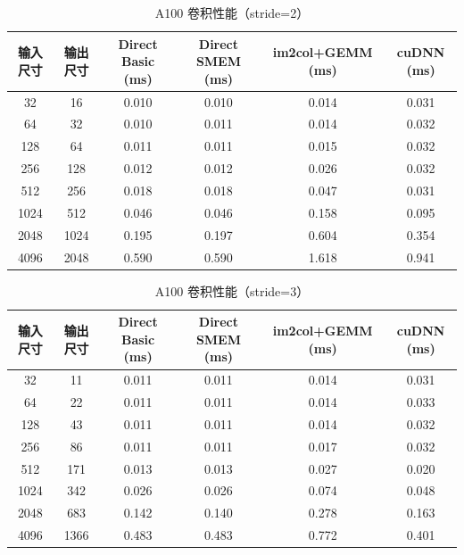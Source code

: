 \documentclass[a4paper]{article}
\begin{document}
\begin{table}[H]
    \centering
    \small
    \caption{A100 卷积性能（stride=2）}
    \begin{tabular}{cccccc}
        \toprule
        \textbf{输入尺寸} & \textbf{输出尺寸} & \textbf{Direct Basic (ms)} & \textbf{Direct SMEM (ms)} & \textbf{im2col+GEMM (ms)} & \textbf{cuDNN (ms)} \\
        \midrule
        32    & 16    & 0.010 & 0.010 & 0.014 & 0.031 \\
        64    & 32    & 0.010 & 0.011 & 0.014 & 0.032 \\
        128   & 64    & 0.011 & 0.011 & 0.015 & 0.032 \\
        256   & 128   & 0.012 & 0.012 & 0.026 & 0.032 \\
        512   & 256   & 0.018 & 0.018 & 0.047 & 0.031 \\
        1024  & 512   & 0.046 & 0.046 & 0.158 & 0.095 \\
        2048  & 1024  & 0.195 & 0.197 & 0.604 & 0.354 \\
        4096  & 2048  & 0.590 & 0.590 & 1.618 & 0.941 \\
        \bottomrule
    \end{tabular}
\end{table}

\begin{table}[H]
    \centering
    \small
    \caption{A100 卷积性能（stride=3）}
    \begin{tabular}{cccccc}
        \toprule
        \textbf{输入尺寸} & \textbf{输出尺寸} & \textbf{Direct Basic (ms)} & \textbf{Direct SMEM (ms)} & \textbf{im2col+GEMM (ms)} & \textbf{cuDNN (ms)} \\
        \midrule
        32    & 11    & 0.011 & 0.011 & 0.014 & 0.031 \\
        64    & 22    & 0.011 & 0.011 & 0.014 & 0.033 \\
        128   & 43    & 0.011 & 0.011 & 0.014 & 0.032 \\
        256   & 86    & 0.011 & 0.011 & 0.017 & 0.032 \\
        512   & 171   & 0.013 & 0.013 & 0.027 & 0.020 \\
        1024  & 342   & 0.026 & 0.026 & 0.074 & 0.048 \\
        2048  & 683   & 0.142 & 0.140 & 0.278 & 0.163 \\
        4096  & 1366  & 0.483 & 0.483 & 0.772 & 0.401 \\
        \bottomrule
    \end{tabular}
\end{table}
\end{document}

